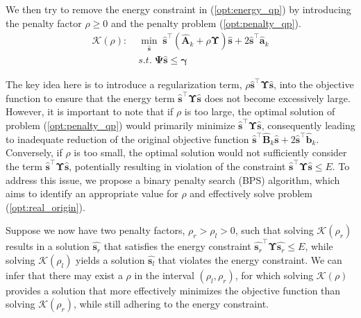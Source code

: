 \documentclass[lettersize,journal]{IEEEtran}
\newcommand{\nocolor}[1]{{\color{black}#1}}
\begin{document}
We then try to remove the energy constraint in (\ref{opt:energy_qp}) by introducing the penalty factor $\rho\geq 0$ and the penalty problem (\ref{opt:penalty_qp}).
\begin{equation}
\label{opt:penalty_qp}
\begin{aligned}
    \mathcal{K}(\rho):\; &\underset{\hat{\mathbf{s}}}{\min} \;
    \hat{\mathbf{s}}^{\top}(\hat{\mathbf{A}}_{k}+\rho\mathbf{\Upsilon})\hat{\mathbf{s}} + 2\hat{\mathbf{s}}^{\top}\hat{\mathbf{a}}_{k} \\
    &s.t.\;
    \mathbf{\Psi}\hat{\mathbf{s}} \leq \bm{\gamma}
\end{aligned}
\end{equation}

\nocolor{The key idea here is to introduce} a regularization term, $\rho\hat{\mathbf{s}}^{\top}\mathbf{\Upsilon}\hat{\mathbf{s}}$, into the objective function to ensure that the energy term $\hat{\mathbf{s}}^{\top}\mathbf{\Upsilon}\hat{\mathbf{s}}$ does not become excessively large. However, it is important to note that if $\rho$ is too large, the optimal solution of problem (\ref{opt:penalty_qp}) would primarily minimize $\hat{\mathbf{s}}^{\top}\mathbf{\Upsilon}\hat{\mathbf{s}}$, consequently leading to inadequate reduction of the original objective function $ \hat{\mathbf{s}}^{\top}\hat{\mathbf{B}}_k\hat{\mathbf{s}} + 2\hat{\mathbf{s}}^{\top}\hat{\mathbf{b}}_k$. Conversely, if $\rho$ is too small, the optimal solution would not sufficiently consider the term $\hat{\mathbf{s}}^{\top}\mathbf{\Upsilon}\hat{\mathbf{s}}$, potentially resulting in violation of the constraint $\hat{\mathbf{s}}^{\top}\mathbf{\Upsilon}\hat{\mathbf{s}} \leq E$. To address this issue, we propose a binary penalty search (BPS) algorithm, which aims to identify an appropriate value for $\rho$ and effectively solve problem (\ref{opt:real_origin}).

Suppose we now have two penalty factors, $\rho_r > \rho_l > 0$, such that solving $\mathcal{K}(\rho_r)$ results in a solution $\hat{\mathbf{s}_r}$ that satisfies the energy constraint $\hat{\mathbf{s}_r}^{\top}\mathbf{\Upsilon}\hat{\mathbf{s}_r} \leq E$, while solving $\mathcal{K}(\rho_l)$ yields a solution $\hat{\mathbf{s}_l}$ that violates the energy constraint. We can infer that there may exist a $\rho$ in the interval $(\rho_l, \rho_r)$, for which solving $\mathcal{K}(\rho)$ provides a solution that more effectively minimizes the objective function than solving $\mathcal{K}(\rho_r)$, while still adhering to the energy constraint.
\end{document}
